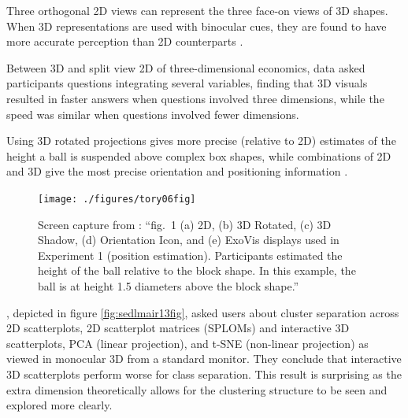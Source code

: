 \documentclass{monashthesis}
\begin{document}
Three orthogonal 2D views can represent the three face-on views of 3D shapes. When 3D representations are used with binocular cues, they are found to have more accurate perception than 2D counterparts \autocite{lee_effects_1986}.

Between 3D and split view 2D of three-dimensional economics, data \textcite{wickens_implications_1994} asked participants questions integrating several variables, finding that 3D visuals resulted in faster answers when questions involved three dimensions, while the speed was similar when questions involved fewer dimensions.

Using 3D rotated projections gives more precise (relative to 2D) estimates of the height a ball is suspended above complex box shapes, while combinations of 2D and 3D give the most precise orientation and positioning information \autocite[depicted in figure \ref{fig:tory06fig}]{tory_visualization_2006}.



\begin{figure}

{\centering \texttt{[image: ./figures/tory06fig]} 

}

\caption{Screen capture from \textcite{tory_visualization_2006}: ``fig.~1 (a) 2D, (b) 3D Rotated, (c) 3D Shadow, (d) Orientation Icon, and (e) ExoVis displays used in Experiment 1 (position estimation). Participants estimated the height of the ball relative to the block shape. In this example, the ball is at height 1.5 diameters above the block shape.''}\label{fig:tory06fig}
\end{figure}

\textcite{sedlmair_empirical_2013}, depicted in figure \ref{fig:sedlmair13fig}, asked users about cluster separation across 2D scatterplots, 2D scatterplot matrices (SPLOMs) and interactive 3D scatterplots, PCA (linear projection), and t-SNE (non-linear projection) as viewed in monocular 3D from a standard monitor. They conclude that interactive 3D scatterplots perform worse for class separation. This result is surprising as the extra dimension theoretically allows for the clustering structure to be seen and explored more clearly.
\end{document}
